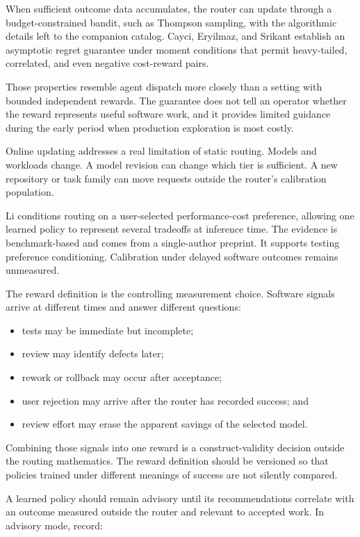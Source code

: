 When sufficient outcome data accumulates, the router can update through a budget-constrained bandit, such as Thompson sampling, with the algorithmic details left to the companion catalog. Cayci, Eryilmaz, and Srikant establish an asymptotic regret guarantee under moment conditions that permit heavy-tailed, correlated, and even negative cost-reward pairs.

Those properties resemble agent dispatch more closely than a setting with bounded independent rewards. The guarantee does not tell an operator whether the reward represents useful software work, and it provides limited guidance during the early period when production exploration is most costly.

Online updating addresses a real limitation of static routing. Models and workloads change. A model revision can change which tier is sufficient. A new repository or task family can move requests outside the router's calibration population.

Li conditions routing on a user-selected performance-cost preference, allowing one learned policy to represent several tradeoffs at inference time. The evidence is benchmark-based and comes from a single-author preprint. It supports testing preference conditioning. Calibration under delayed software outcomes remains unmeasured.

The reward definition is the controlling measurement choice. Software signals arrive at different times and answer different questions:

\begin{itemize}
\tightlist
\item
  tests may be immediate but incomplete;
\item
  review may identify defects later;
\item
  rework or rollback may occur after acceptance;
\item
  user rejection may arrive after the router has recorded success; and
\item
  review effort may erase the apparent savings of the selected model.
\end{itemize}

Combining those signals into one reward is a construct-validity decision outside the routing mathematics. The reward definition should be versioned so that policies trained under different meanings of success are not silently compared.

A learned policy should remain advisory until its recommendations correlate with an outcome measured outside the router and relevant to accepted work. In advisory mode, record:

